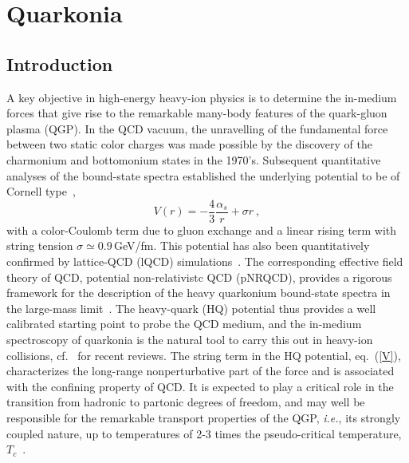 \documentclass[../report.tex]{subfiles}
\begin{document}
\section{Quarkonia}

\subsection{Introduction}
\label{sec_intro}
A key objective in high-energy heavy-ion physics is to determine the in-medium forces 
that give rise to the remarkable many-body features of the quark-gluon plasma (QGP).
In the QCD vacuum, the unravelling of the fundamental force between two static color charges  
was made possible by the discovery of the charmonium and bottomonium states in the 1970's. 
Subsequent quantitative analyses of the bound-state spectra established the underlying
potential to be of Cornell type~\cite{Eichten:1979ms}, 
\begin{equation}
V(r) = -\frac{4}{3} \frac{\alpha_s}{r} + \sigma r \ ,
\label{V}
\end{equation} 
with a color-Coulomb term due to gluon exchange and a linear rising term with string
tension $\sigma\simeq0.9$\,GeV/fm. This potential has also been quantitatively confirmed 
by lattice-QCD (lQCD) simulations~\cite{Bali:2000gf}. 
The corresponding effective field theory of QCD, potential non-relativistc QCD
(pNRQCD), provides a rigorous framework for the description of the heavy quarkonium
bound-state spectra in the large-mass limit~\cite{Brambilla:2004wf}.
The heavy-quark (HQ) potential thus provides a well calibrated starting point to probe the 
QCD medium, and the in-medium spectroscopy of quarkonia is the natural tool to carry this 
out in heavy-ion collisions, cf.~\cite{Rapp:2008tf,BraunMunzinger:2009ih,Kluberg:2009wc,Mocsy:2013syh,Liu:2015izf} 
for recent reviews.
The string term in the HQ potential, eq.~(\ref{V}), characterizes the long-range nonperturbative 
part of the force and is associated with the confining property of QCD. It is expected to play 
a critical role in the transition from hadronic to partonic degrees of freedom, and may well be 
responsible for the remarkable transport properties of the QGP, {\it i.e.}, its strongly coupled 
nature, up to temperatures of 2-3 times the pseudo-critical temperature, $T_c$~\cite{Liu:2016ysz}. 
\end{document}
